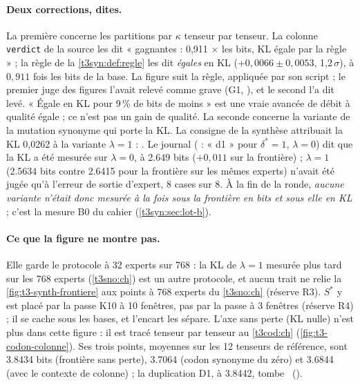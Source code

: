 \paragraph{Deux corrections, dites.} La première concerne les partitions par $\kappa$ tenseur par tenseur. La colonne \texttt{verdict} de la source les dit « gagnantes : 0,911 × les bits, KL égale par la règle » ; la règle de la \cref{t3syn:def:regle} les dit \emph{égales} en KL ($+0{,}0066 \pm 0{,}0053$, 1,2\,$\sigma$), à $0{,}911$ fois les bits de la base. La figure suit la règle, appliquée par son script ; le premier juge des figures l'avait relevé comme grave (G1, ), et le second l'a dit levé. « Égale en KL pour 9\,\% de bits de moins » est une vraie avancée de débit à qualité égale ; ce n'est pas un gain de qualité. La seconde concerne la variante de la mutation synonyme qui porte la KL. La consigne de la synthèse attribuait la KL 0,0262 à la variante $\lambda = 1$ : . Le journal ( : « d1 » pour $\delta^{*} = 1$, $\lambda = 0$) dit que la KL a été mesurée sur $\lambda = 0$, à \num{2.649} bits ($+0{,}011$ sur la frontière) ; $\lambda = 1$ (\num{2.5634} bits contre \num{2.6415} pour la frontière sur les mêmes experts) n'avait été jugée qu'à l'erreur de sortie d'expert, 8 cases sur 8. À la fin de la ronde, \emph{aucune variante n'était donc mesurée à la fois sous la frontière en bits et sous elle en KL} ; c'est la mesure B0 du cahier (\cref{t3syn:sec:lot-b}).

\paragraph{Ce que la figure ne montre pas.} Elle garde le protocole à 32 experts sur 768 : la KL de $\lambda = 1$ mesurée plus tard sur les 768 experts (\cref{t3sno:ch}) est un autre protocole, et aucun trait ne relie la \cref{fig:t3-synth-frontiere} aux points à 768 experts du \cref{t3sno:ch} (réserve R3). $S^{*}$ y est placé par la passe K10 à 10 fenêtres, pas par la passe à 3 fenêtres (réserve R4) ; il se cache sous les bases, et l'encart les sépare. L'axe sans perte (KL nulle) n'est plus dans cette figure : il est tracé tenseur par tenseur au \cref{t3cod:ch} (\cref{fig:t3-codon-colonne}). Ses trois points, moyennes sur les 12 tenseurs de référence, sont \num{3.8434} bits (frontière sans perte), \num{3.7064} (codon synonyme du zéro) et \num{3.6844} (avec le contexte de colonne) ; la duplication D1, à \num{3.8442}, tombe \mes~().

